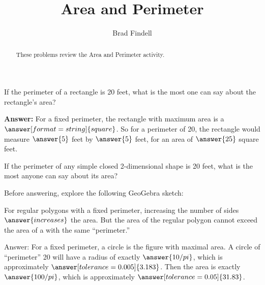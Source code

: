 \documentclass[nooutcomes]{ximera}
\title{Area and Perimeter}
\author{Brad Findell}
\begin{document}
\begin{abstract}
These problems review the Area and Perimeter activity.  
\end{abstract}
\maketitle

%
%
%
%

\begin{problem}
If the perimeter of a rectangle is 20 feet, what is the most one can say about the rectangle's area? 

\textbf{Answer:}  For a fixed perimeter, the rectangle with maximum area is a $\answer[format=string]{square}$.  So for a perimeter of 20, the rectangle would measure $\answer{5}$ feet by $\answer{5}$ feet, for an area of $\answer{25}$ square feet.  

\begin{problem}
If the perimeter of any simple closed 2-dimensional shape is 20 feet, what is the most anyone can say about its area?

Before answering, explore the following GeoGebra sketch:  
\begin{center}  
\end{center}
For regular polygons with a fixed perimeter, increasing the number of sides
$\answer{increases}$ the area.  But the area of the regular polygon cannot 
exceed the area of a 
with the same ``perimeter.''

\begin{problem}
Answer: For a fixed perimeter, a circle is the figure with maximal area.  A circle of ``perimeter'' 20 will have a radius of exactly $\answer{10/pi}$, which is approximately 
$\answer[tolerance=0.005]{3.183}$.  
Then the area is exactly $\answer{100/pi}$, which is approximately 
$\answer[tolerance=0.05]{31.83}$.  
\end{problem}
\end{problem}
\end{problem}
\end{document}
